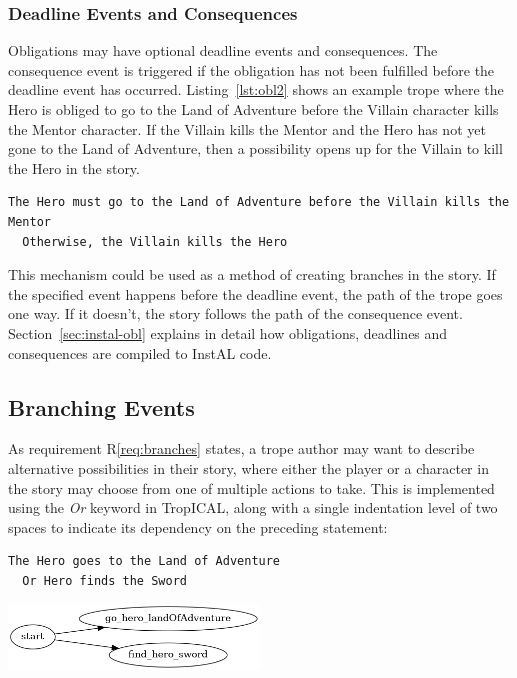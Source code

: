 \documentclass[11pt]{report}
\begin{document}
\subsubsection{Deadline Events and Consequences}
Obligations may have optional deadline events and consequences. The consequence
event is triggered if the obligation has not been fulfilled before the deadline
event has occurred. Listing~\ref{lst:obl2} shows an example trope where the Hero
is obliged to go to the Land of Adventure before the Villain character kills the
Mentor character. If the Villain kills the Mentor and the Hero has not yet gone
to the Land of Adventure, then a possibility opens up for the Villain to kill
the Hero in the story.

\begin{lstlisting}[label={lst:obl2}, caption={An obliged event with a deadline
and a consequence}]
The Hero must go to the Land of Adventure before the Villain kills the Mentor
  Otherwise, the Villain kills the Hero
\end{lstlisting}

This mechanism could be used as a method of creating branches in the story. If the
specified event happens before the deadline event, the path of the trope goes
one way. If it doesn't, the story follows the path of the consequence event.
Section~\ref{sec:instal-obl} explains in detail how obligations, deadlines and
consequences are compiled to InstAL code.

\subsection{Branching Events}
\label{sec:branch-code}
As requirement R\ref{req:branches} states, a trope author may want to describe alternative possibilities in their story,
where either the player or a character in the story may choose from one of
multiple actions to take. This is implemented using the \emph{Or} keyword in
TropICAL, along with a single indentation level of two spaces to indicate its
dependency on the preceding statement:

\begin{lstlisting}[label={lst:branch1}, caption={Two branches}]
The Hero goes to the Land of Adventure
  Or Hero finds the Sword
\end{lstlisting}

\vspace{7mm}
\centerline{\includegraphics[width=0.5\textwidth]{branch1.png}}
\vspace{7mm}
\end{document}
